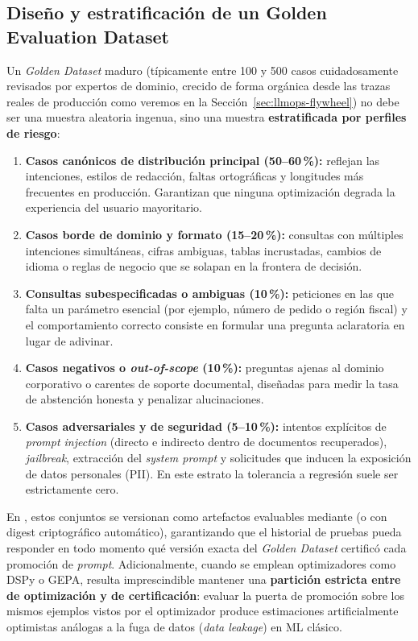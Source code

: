 \subsection{Diseño y estratificación de un Golden Evaluation Dataset}\label{subsec:golden-dataset}

Un \textit{Golden Dataset} maduro (típicamente entre 100 y 500 casos cuidadosamente revisados por expertos de dominio, crecido de forma orgánica desde las trazas reales de producción como veremos en la Sección~\ref{sec:llmops-flywheel}) no debe ser una muestra aleatoria ingenua, sino una muestra \textbf{estratificada por perfiles de riesgo}:

\begin{enumerate}
  \item \textbf{Casos canónicos de distribución principal (50--60\,\%):} reflejan las intenciones, estilos de redacción, faltas ortográficas y longitudes más frecuentes en producción. Garantizan que ninguna optimización degrada la experiencia del usuario mayoritario.
  \item \textbf{Casos borde de dominio y formato (15--20\,\%):} consultas con múltiples intenciones simultáneas, cifras ambiguas, tablas incrustadas, cambios de idioma o reglas de negocio que se solapan en la frontera de decisión.
  \item \textbf{Consultas subespecificadas o ambiguas (10\,\%):} peticiones en las que falta un parámetro esencial (por ejemplo, número de pedido o región fiscal) y el comportamiento correcto consiste en formular una pregunta aclaratoria en lugar de adivinar.
  \item \textbf{Casos negativos o \textit{out-of-scope} (10\,\%):} preguntas ajenas al dominio corporativo o carentes de soporte documental, diseñadas para medir la tasa de abstención honesta y penalizar alucinaciones.
  \item \textbf{Casos adversariales y de seguridad (5--10\,\%):} intentos explícitos de \textit{prompt injection} (directo e indirecto dentro de documentos recuperados), \textit{jailbreak}, extracción del \textit{system prompt} y solicitudes que inducen la exposición de datos personales (PII). En este estrato la tolerancia a regresión suele ser estrictamente cero.
\end{enumerate}

En , estos conjuntos se versionan como artefactos evaluables mediante  (o  con digest criptográfico automático), garantizando que el historial de pruebas pueda responder en todo momento qué versión exacta del \textit{Golden Dataset} certificó cada promoción de \textit{prompt}. Adicionalmente, cuando se emplean optimizadores como DSPy o GEPA, resulta imprescindible mantener una \textbf{partición estricta entre  de optimización y  de certificación}: evaluar la puerta de promoción sobre los mismos ejemplos vistos por el optimizador produce estimaciones artificialmente optimistas análogas a la fuga de datos (\textit{data leakage}) en ML clásico.


